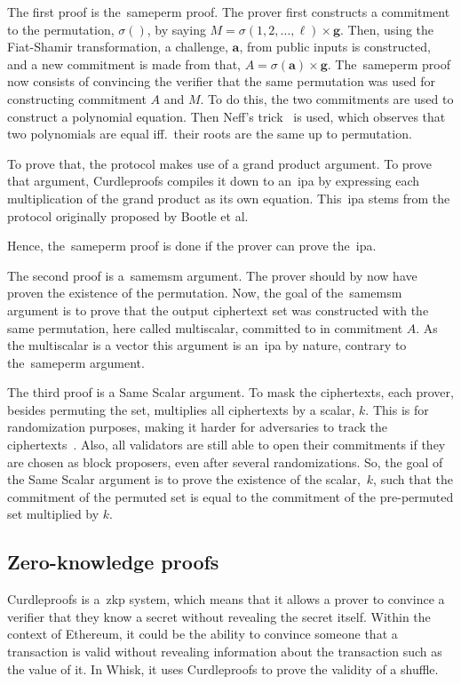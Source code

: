 The first proof is the~\gls{sameperm} proof.
The prover first constructs a commitment to the permutation, $\sigma()$, by saying $M=\sigma(1,2,\dots,\ell)\times\mathbf{g}$.
Then, using the Fiat-Shamir transformation, a challenge, $\mathbf{a}$, from public inputs is constructed, and a new commitment is made from that, $A=\sigma(\mathbf{a})\times\mathbf{g}$.
The~\gls{sameperm} proof now consists of convincing the verifier that the same permutation was used for constructing commitment $A$ and $M$.
To do this, the two commitments are used to construct a polynomial equation.
Then Neff's trick~\cite{10.1145/501983.502000} is used, which observes that two polynomials are equal iff.\ their roots are the same up to permutation.

To prove that, the protocol makes use of a grand product argument.
To prove that argument, Curdleproofs compiles it down to an~\gls{ipa} by expressing each multiplication of the grand product as its own equation.
This~\gls{ipa} stems from the protocol originally proposed by Bootle et al.~\cite{cryptoeprint:2016/263,Curdleproofs}

Hence, the~\gls{sameperm} proof is done if the prover can prove the~\gls{ipa}.


The second proof is a~\gls{samemsm} argument.
The prover should by now have proven the existence of the permutation.
Now, the goal of the~\gls{samemsm} argument is to prove that the output ciphertext set was constructed with the same permutation, here called multiscalar, committed to in commitment $A$.
As the multiscalar is a vector this argument is an~\gls{ipa} by nature, contrary to the~\gls{sameperm} argument.

The third proof is a Same Scalar argument.
To mask the ciphertexts, each prover, besides permuting the set, multiplies all ciphertexts by a scalar, $k$.
This is for randomization purposes, making it harder for adversaries to track the ciphertexts~\cite{Whisk2024}.
Also, all validators are still able to open their commitments if they are chosen as block proposers, even after several randomizations.
So, the goal of the Same Scalar argument is to prove the existence of the scalar,~$k$, such that the commitment of the permuted set is equal to the commitment of the pre-permuted set multiplied by $k$.



\subsection{Zero-knowledge proofs}\label{sec:background-zkps}
Curdleproofs is a~\gls{zkp} system, which means that it allows a prover to convince a verifier that they know a secret without revealing the secret itself.
Within the context of Ethereum, it could be the ability to convince someone that a transaction is valid without revealing information about the transaction such as the value of it.
In Whisk, it uses Curdleproofs to prove the validity of a shuffle.

